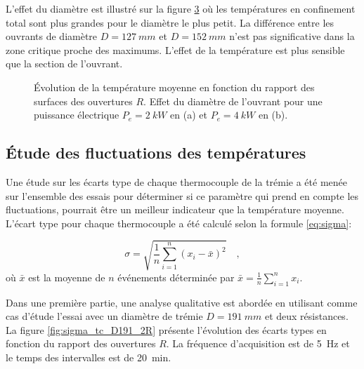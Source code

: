 L'effet du diamètre est illustré sur la figure \ref{fig:T_moy_effet_D} où les températures en confinement total sont plus grandes pour le diamètre le plus petit. La différence entre les ouvrants de diamètre ${D=\SI{127}{mm}}$ et ${D=\SI{152}{mm}}$ n'est pas significative dans la zone critique proche des maximums. L'effet de la température est plus sensible que la section de l'ouvrant.

\begin{figure}
\centering
\begin{subfigure}[t]{0.485\textwidth}
  \centering
  \resizebox{\textwidth}{!}{}
  \caption{}
  \label{fig:T_moy_effet_D_1R}
\end{subfigure}
\begin{subfigure}[t]{0.485\textwidth}
  \centering
  \resizebox{\textwidth}{!}{}
  \caption{}
  \label{fig:T_moy_effet_D_2R}
\end{subfigure}
\caption{Évolution de la température moyenne en fonction du rapport des surfaces des ouvertures $R$. Effet du diamètre de l'ouvrant pour une puissance électrique ${P_e=\SI{2}{kW}}$ en (a) et ${P_e=\SI{4}{kW}}$ en (b).}
\label{fig:T_moy_effet_D}
\end{figure}

\subsection{Étude des fluctuations des températures}
Une étude sur les écarts type de chaque thermocouple de la trémie a été menée sur l'ensemble des essais pour déterminer si ce paramètre qui prend en compte les fluctuations, pourrait être un meilleur indicateur que la température moyenne. L'écart type pour chaque thermocouple a été calculé selon la formule \eqref{eq:sigma}:

\begin{equation}
\sigma = \sqrt{\frac{1}{n} \sum\limits_{i=1}^{n} (x_i - \bar x)^2 } \quad ,
\label{eq:sigma}
\end{equation}
\noindent où $\bar x$ est la moyenne de $n$ événements déterminée par $\bar x = \frac{1}{n} \sum\limits_{i=1}^{n} x_i$.
\vspace{0.5\baselineskip}

Dans une première partie, une analyse qualitative est abordée en utilisant comme cas d'étude l'essai avec un diamètre de trémie $D=\SI{191}{mm}$ et deux résistances. La figure \ref{fig:sigma_tc_D191_2R} présente l'évolution des écarts types en fonction du rapport des ouvertures $R$. La fréquence d'acquisition est de \SI{5}{Hz} et le temps des intervalles est de \SI{20}{min}.

